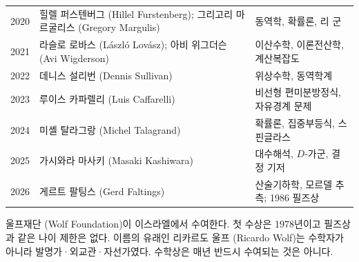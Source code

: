 \begin{center}
\begin{longtable}{@{}L{0.075\textwidth}L{0.31\textwidth}L{0.525\textwidth}@{}}
2020 & 힐렐 퍼스텐버그 (Hillel Furstenberg); 그리고리 마르굴리스 (Gregory Margulis) & 동역학, 확률론, 리 군\\
2021 & 라슬로 로바스 (László Lovász); 아비 위그더슨 (Avi Wigderson) & 이산수학, 이론전산학, 계산복잡도\\
2022 & 데니스 설리번 (Dennis Sullivan) & 위상수학, 동역학계\\
2023 & 루이스 카파렐리 (Luis Caffarelli) & 비선형 편미분방정식, 자유경계 문제\\
2024 & 미셸 탈라그랑 (Michel Talagrand) & 확률론, 집중부등식, 스핀글라스\\
2025 & 가시와라 마사키 (Masaki Kashiwara) & 대수해석, $D$-가군, 결정 기저\\
2026 & 게르트 팔팅스 (Gerd Faltings) & 산술기하학, 모르델 추측; 1986 필즈상\\
\end{longtable}
\end{center}


\begin{fact}[울프 수학상 기본]
울프재단 (Wolf Foundation)이 이스라엘에서 수여한다. 첫 수상은 1978년이고 필즈상과 같은 나이 제한은 없다. 이름의 유래인 리카르도 울프 (Ricardo Wolf)는 수학자가 아니라 발명가·외교관·자선가였다. 수학상은 매년 반드시 수여되는 것은 아니다.
\end{fact}


